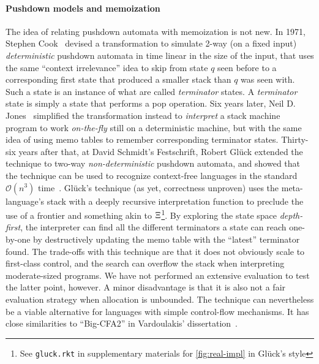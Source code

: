\paragraph{Pushdown models and memoization}
The idea of relating pushdown automata with memoization is not new.
%
In 1971, Stephen Cook~\citep{DBLP:conf/ifip/Cook71} devised a transformation to simulate 2-way (on a fixed input) \emph{deterministic} pushdown automata in time linear in the size of the input, that uses the same ``context irrelevance'' idea to skip from state $q$ seen before to a corresponding first state that produced a smaller stack than $q$ was seen with.
%
Such a state is an instance of what are called \emph{terminator} states.
%
A \emph{terminator} state is simply a state that performs a pop operation.
%
Six years later, Neil D. Jones~\citep{Jones:1977:NLT} simplified the transformation instead to \emph{interpret} a stack machine program to work \emph{on-the-fly} still on a deterministic machine, but with the same idea of using memo tables to remember corresponding terminator states.
%
Thirty-six years after that, at David Schmidt's Festschrift, Robert Gl\"uck extended the technique to two-way \emph{non-deterministic} pushdown automata, and showed that the technique can be used to recognize context-free languages in the standard ${\mathcal O}(n^3)$ time~\citep{DBLP:journals/corr/Gluck13}.
%
Gl\"uck's technique (as yet, correctness unproven) uses the meta-language's stack with a deeply recursive interpretation function to preclude the use of a frontier and something akin to $\Xi$\footnote{See \texttt{gluck.rkt} in supplementary materials for \autoref{fig:real-impl} in Gl\"uck's style}.
%
By exploring the state space \emph{depth-first}, the interpreter can find all the different terminators a state can reach one-by-one by destructively updating the memo table with the ``latest'' terminator found.
%
The trade-offs with this technique are that it does not obviously scale to first-class control, and the search can overflow the stack when interpreting moderate-sized programs.
%
We have not performed an extensive evaluation to test the latter point, however.
%
A minor disadvantage is that it is also not a fair evaluation strategy when allocation is unbounded.
%
The technique can nevertheless be a viable alternative for languages with simple control-flow mechanisms.
%
It has close similarities to ``Big-CFA2'' in Vardoulakis' dissertation~\citep{vardoulakis-diss12}.


